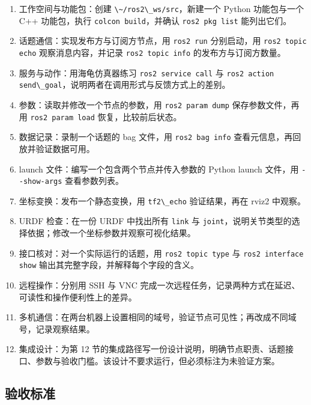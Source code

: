 \begin{enumerate}
\def\labelenumi{\arabic{enumi}.}
\tightlist
\item
  工作空间与功能包：创建
  \passthrough{\lstinline!\~/ros2\_ws/src!}，新建一个 Python
  功能包与一个 C++ 功能包，执行
  \passthrough{\lstinline!colcon build!}，并确认
  \passthrough{\lstinline!ros2 pkg list!} 能列出它们。
\item
  话题通信：实现发布方与订阅方节点，用
  \passthrough{\lstinline!ros2 run!} 分别启动，用
  \passthrough{\lstinline!ros2 topic echo!} 观察消息内容，并记录
  \passthrough{\lstinline!ros2 topic info!} 的发布方与订阅方数量。
\item
  服务与动作：用海龟仿真器练习
  \passthrough{\lstinline!ros2 service call!} 与
  \passthrough{\lstinline!ros2 action send\_goal!}，说明两者在调用形式与反馈方式上的差别。
\item
  参数：读取并修改一个节点的参数，用
  \passthrough{\lstinline!ros2 param dump!} 保存参数文件，再用
  \passthrough{\lstinline!ros2 param load!} 恢复，比较前后状态。
\item
  数据记录：录制一个话题的 bag 文件，用
  \passthrough{\lstinline!ros2 bag info!}
  查看元信息，再回放并验证数据可用。
\item
  launch 文件：编写一个包含两个节点并传入参数的 Python launch 文件，用
  \passthrough{\lstinline!--show-args!} 查看参数列表。
\item
  坐标变换：发布一个静态变换，用 \passthrough{\lstinline!tf2\_echo!}
  验证结果，再在 rviz2 中观察。
\item
  URDF 检查：在一份 URDF 中找出所有 \passthrough{\lstinline!link!} 与
  \passthrough{\lstinline!joint!}，说明关节类型的选择依据；修改一个坐标参数并观察可视化结果。
\item
  接口核对：对一个实际运行的话题，用
  \passthrough{\lstinline!ros2 topic type!} 与
  \passthrough{\lstinline!ros2 interface show!}
  输出其完整字段，并解释每个字段的含义。
\item
  远程操作：分别用 SSH 与 VNC
  完成一次远程任务，记录两种方式在延迟、可读性和操作便利性上的差异。
\item
  多机通信：在两台机器上设置相同的域号，验证节点可见性；再改成不同域号，记录观察结果。
\item
  集成设计：为第 12
  节的集成路径写一份设计说明，明确节点职责、话题接口、参数与验收门槛。该设计不要求运行，但必须标注为未验证方案。
\end{enumerate}

\subsection{验收标准}\label{ux9a8cux6536ux6807ux51c6}

